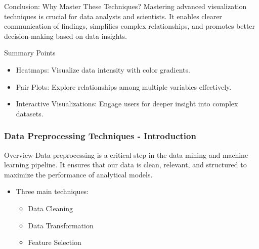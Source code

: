 \documentclass[aspectratio=169]{beamer}
\begin{document}
\begin{frame}{Conclusion: Why Master These Techniques?}
    Mastering advanced visualization techniques is crucial for data analysts and scientists. It enables clearer communication of findings, simplifies complex relationships, and promotes better decision-making based on data insights. 

    \begin{block}{Summary Points}
        \begin{itemize}
            \item Heatmaps: Visualize data intensity with color gradients.
            \item Pair Plots: Explore relationships among multiple variables effectively.
            \item Interactive Visualizations: Engage users for deeper insight into complex datasets. 
        \end{itemize}
    \end{block}
\end{frame}

\begin{frame}[fragile]
    \frametitle{Data Preprocessing Techniques - Introduction}
    \begin{block}{Overview}
        Data preprocessing is a critical step in the data mining and machine learning pipeline. 
        It ensures that our data is clean, relevant, and structured to maximize the performance of analytical models.
    \end{block}
    \begin{itemize}
        \item Three main techniques:
        \begin{itemize}
            \item Data Cleaning
            \item Data Transformation
            \item Feature Selection
        \end{itemize}
    \end{itemize}
\end{frame}
\end{document}
